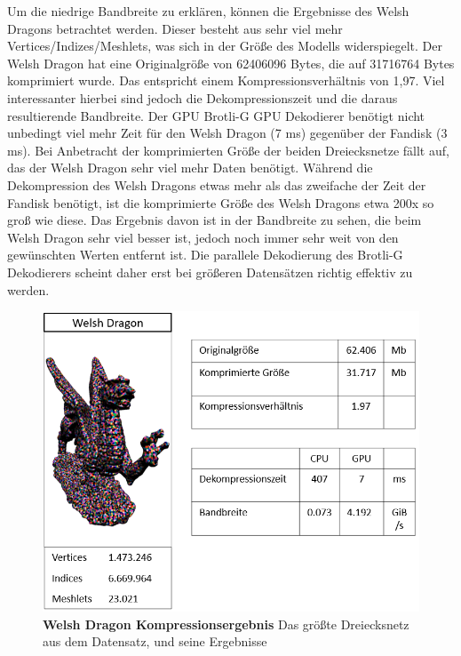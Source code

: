 Um die niedrige Bandbreite zu erklären, können die Ergebnisse des Welsh Dragons betrachtet werden. 
Dieser besteht aus sehr viel mehr Vertices/Indizes/Meshlets, was sich in der Größe des Modells widerspiegelt. 
Der Welsh Dragon hat eine Originalgröße von 62406096 Bytes, die auf 31716764 Bytes komprimiert wurde. 
Das entspricht einem Kompressionsverhältnis von 1,97.
Viel interessanter hierbei sind jedoch die Dekompressionszeit und die daraus resultierende Bandbreite. 
Der GPU Brotli-G GPU Dekodierer benötigt nicht unbedingt viel mehr Zeit für den Welsh Dragon (7 ms) gegenüber der Fandisk (3 ms).
Bei Anbetracht der komprimierten Größe der beiden Dreiecksnetze fällt auf, das der Welsh Dragon sehr viel mehr Daten benötigt. 
Während die Dekompression des Welsh Dragons etwas mehr als das zweifache der Zeit der Fandisk benötigt, ist die komprimierte Größe des Welsh Dragons etwa 200x so groß wie diese.
Das Ergebnis davon ist in der Bandbreite zu sehen, die beim Welsh Dragon sehr viel besser ist, jedoch noch immer sehr weit von den gewünschten Werten entfernt ist.
Die parallele Dekodierung des Brotli-G Dekodierers scheint daher erst bei größeren Datensätzen richtig effektiv zu werden.

\begin{figure}[htb]
  \centering  
  \includegraphics[scale=0.7]{Bilder/welshdragon_ergebniss.png}
  \caption[Welsh Dragon Kompressionsergebnis]{\textbf{Welsh Dragon Kompressionsergebnis} Das größte Dreiecksnetz aus dem Datensatz, und seine Ergebnisse}
  \label{fig:mesh_shading_pipeline}
\end{figure}

